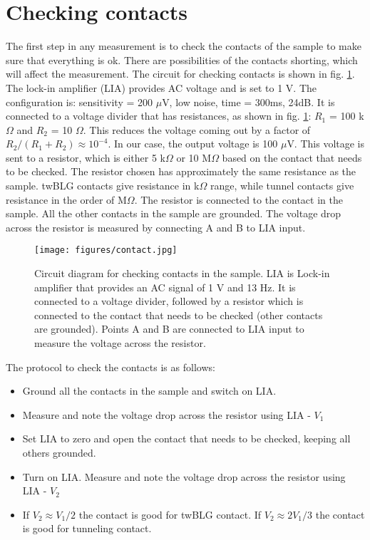 \section{Checking contacts}
\label{section:d}

The first step in any measurement is to check the contacts of the sample to make sure that everything is ok. There are possibilities of the contacts shorting, which will affect the measurement. The circuit for checking contacts is shown in fig. \ref{fig:contact}. The lock-in amplifier (LIA) provides AC voltage and is set to 1 V. The configuration is: sensitivity = 200 $\mu$V, low noise, time = 300ms, 24dB. It is connected to a voltage divider that has resistances, as shown in fig. \ref{fig:contact}: $R_1$ = 100 k$\Omega$ and $R_2$ = 10 $\Omega$. This reduces the voltage coming out by a factor of $R_2/(R_1+R_2)\approx 10^{-4}$. In our case, the output voltage is 100 $\mu$V. This voltage is sent to a resistor, which is either 5 k$\Omega$ or 10 M$\Omega$ based on the contact that needs to be checked. The resistor chosen has approximately the same resistance as the sample. twBLG contacts give resistance in k$\Omega$ range, while tunnel contacts give resistance in the order of M$\Omega$. The resistor is connected to the contact in the sample. All the other contacts in the sample are grounded. The voltage drop across the resistor is measured by connecting A and B to LIA input.

\begin{figure}[H]
	\centering
	\texttt{[image: figures/contact.jpg]}
	\caption{Circuit diagram for checking contacts in the sample. LIA is Lock-in amplifier that provides an AC signal of 1 V and 13 Hz. It is connected to a voltage divider, followed by a resistor which is connected to the contact that needs to be checked (other contacts are grounded). Points A and B are connected to LIA input to measure the voltage across the resistor.}
	\label{fig:contact}
\end{figure}

The protocol to check the contacts is as follows:
\begin{itemize}
	\item Ground all the contacts in the sample and switch on LIA.
	\item Measure and note the voltage drop across the resistor using LIA - $V_1$
	\item Set LIA to zero and open the contact that needs to be checked, keeping all others grounded.
	\item Turn on LIA. Measure and note the voltage drop across the resistor using LIA - $V_2$
	\item If $V_2 \approx V_1/2$ the contact is good for twBLG contact. If $V_2 \approx 2V_1/3$ the contact is good for tunneling contact.
\end{itemize}

